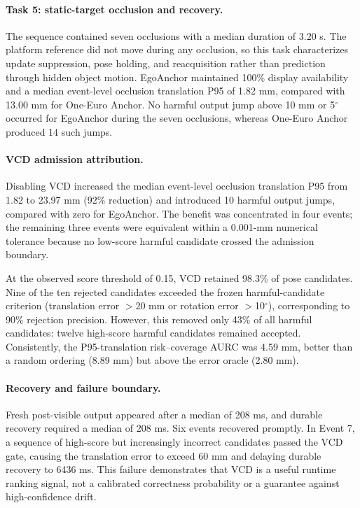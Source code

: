 \paragraph{Task 5: static-target occlusion and recovery.}
The sequence contained seven occlusions with a median duration of
3.20 s. The platform reference did not move
during any occlusion, so this task characterizes update suppression, pose
holding, and reacquisition rather than prediction through hidden object motion.
EgoAnchor maintained 100\% display availability and a median event-level
occlusion translation P95 of
1.82 mm,
compared with
13.00 mm
for One-Euro Anchor. No harmful output jump above 10 mm or
5$^\circ$ occurred for EgoAnchor during the seven occlusions, whereas
One-Euro Anchor produced 14
such jumps.

\paragraph{VCD admission attribution.}
Disabling VCD increased the median event-level occlusion translation P95 from
1.82 to 23.97 mm
(92\% reduction) and introduced
10 harmful output jumps, compared
with zero for EgoAnchor. The benefit was concentrated in four events; the
remaining three events were equivalent within a 0.001-mm numerical tolerance because no
low-score harmful candidate crossed the admission boundary.

At the observed score threshold of 0.15, VCD
retained 98.3\% of pose candidates. Nine of the ten
rejected candidates exceeded the frozen harmful-candidate criterion
(translation error $>$20 mm or rotation error $>$10$^\circ$), corresponding to
90\% rejection precision. However, this
removed only 43\% of all harmful candidates:
twelve high-score harmful candidates remained accepted. Consistently, the
P95-translation risk--coverage AURC was
4.59 mm, better than a random ordering
(8.89 mm) but above the error oracle
(2.80 mm).

\paragraph{Recovery and failure boundary.}
Fresh post-visible output appeared after a median of
208 ms, and durable
recovery required a median of
208 ms. Six events
recovered promptly. In Event 7, a sequence of high-score but increasingly
incorrect candidates passed the VCD gate, causing the translation error to
exceed 60 mm and delaying durable recovery to
6436 ms. This failure
demonstrates that VCD is a useful runtime ranking signal, not a calibrated
correctness probability or a guarantee against high-confidence drift.
